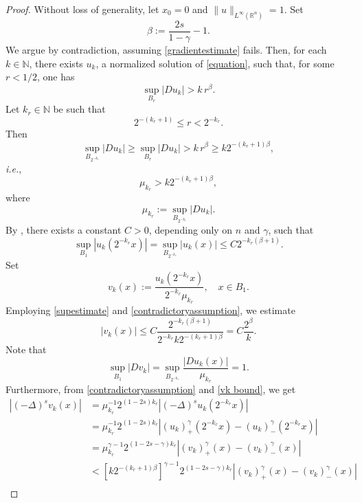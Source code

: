 \documentclass[10pt,a4paper]{amsart}
\newcommand{\R}{\mathbb{R}}
\begin{document}
\begin{proof}    
    Without loss of generality, let $x_0=0$ and $\|u\|_{L^\infty(\R^n)}=1$. Set 
    $$
    \beta:=\frac{2s}{1-\gamma}-1.
    $$
    We argue by contradiction, assuming \eqref{gradientestimate} fails. Then, for each $k\in\mathbb{N}$, there exists $u_k$, a normalized solution of \eqref{equation}, such that, for some $r<1/2$, one has
    $$
    \sup_{B_{r}}|Du_k|>k\,r^\beta.
    $$    
    Let $k_r\in\mathbb{N}$ be such that
    $$
    2^{-(k_r+1)}\le r<2^{-k_r}.
    $$
    Then
    $$
    \sup_{B_{2^{-k_r}}}|Du_k|\ge\sup_{B_r}|Du_k|>k\,r^\beta\ge k2^{-(k_r+1)\beta},
    $$
    \textit{i.e.},    
    \begin{equation}\label{contradictoryassumption}
        \mu_{k_r}>k2^{-(k_r+1)\beta}, 
    \end{equation}
    where
    $$
    \mu_{k_r}:=\sup_{B_{2^{-k_r}}}|Du_k|.
    $$    
    By , there exists a constant $C>0$, depending only on $n$ and $\gamma$, such that  
    \begin{equation}\label{supestimate}      
    \sup_{B_1}|u_k(2^{-k_r} x)|=\sup_{B_{2^{-k_r}}}|u_k(x)|\le C2^{-k_r(\beta+1)}.
    \end{equation}   
    Set      
    $$
    v_k(x):=\frac{u_k(2^{-k_r}x)}{2^{-k_r}\mu_{k_r}}, \quad x\in B_{1}.
    $$
    Employing \eqref{supestimate} and \eqref{contradictoryassumption}, we estimate
    \begin{equation}\label{vk bound}
    |v_k(x)|\le C\frac{2^{-k_r(\beta+1)}}{2^{-k_r}k2^{-(k_r+1)\beta}}=C\frac{2^\beta}{k}.
    \end{equation}    
    Note that
    \begin{equation}\label{sup of grad vk}      \sup_{B_{1}}|Dv_k|=\sup_{B_{2^{-k_r}}}\frac{|Du_k(x)|}{\mu_{k_r}}=1.
    \end{equation}    
   Furthermore, from \eqref{contradictoryassumption} and \eqref{vk bound}, we get
   \begin{align}\label{fractional Laplacian estimate}
    |(-\Delta)^{s}v_k(x)|&=\mu_{k_r}^{-1}2^{(1-2s)k_r}|(-\Delta)^s u_k(2^{-k_r}x)|\nonumber\\
    &=\mu_{k_r}^{-1}2^{(1-2s)k_r}\left|(u_k)_+^{\gamma}(2^{-k_r}x)-(u_k)_-^\gamma(2^{-k_r}x)\right|\nonumber\\
    &=\mu_{k_r}^{\gamma-1}2^{(1-2s-\gamma)k_r}\left|(v_k)_+^{\gamma}(x)-(v_k)_-^\gamma(x)\right|\nonumber\\
    &<\left[k2^{-(k_r+1)\beta}\right]^{\gamma-1}2^{(1-2s-\gamma)k_r}\left|(v_k)_+^{\gamma}(x)-(v_k)_-^\gamma(x)\right|\nonumber\\

\end{align}
\end{proof}
\end{document}
